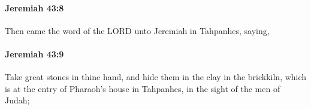 		\paragraph{Jeremiah 43:8} %
			\label{JEREMIAH-43-8}

			Then came the word of the LORD unto Jeremiah in Tahpanhes, saying,


		\paragraph{Jeremiah 43:9} %
			\label{JEREMIAH-43-9}

			Take great stones in thine hand, and hide them in the clay in the brickkiln, which is at the entry of Pharaoh’s house in Tahpanhes, in the sight of the men of Judah;


